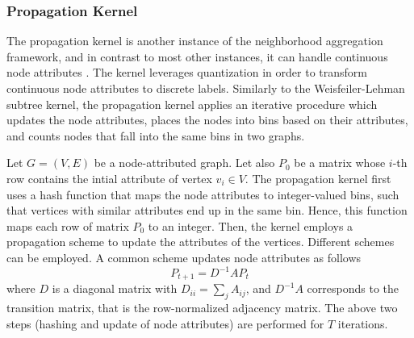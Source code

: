 \documentclass[twoside,11pt]{article}
\begin{document}
\subsubsection{Propagation Kernel}
The propagation kernel is another instance of the neighborhood aggregation framework, and in contrast to most other instances, it can handle continuous node attributes .
The kernel leverages quantization in order to transform continuous node attributes to discrete labels.
Similarly to the Weisfeiler-Lehman subtree kernel, the propagation kernel applies an iterative procedure which updates the node attributes, places the nodes into bins based on their attributes, and counts nodes that fall into the same bins in two graphs. 

Let $G=(V,E)$ be a node-attributed graph.
Let also $P_0$ be a matrix whose $i$-th row contains the intial attribute of vertex $v_i \in V$.
The propagation kernel first uses a hash function that maps the node attributes to integer-valued bins, such that vertices with similar attributes end up in the same bin.
Hence, this function maps each row of matrix $P_0$ to an integer.
Then, the kernel employs a propagation scheme to update the attributes of the vertices.
Different schemes can be employed.
A common scheme updates node attributes as follows
\begin{equation}
  P_{t+1} = D^{-1} A P_t
\end{equation}
where $D$ is a diagonal matrix with $D_{ii} = \sum_j A_{ij}$, and $D^{-1} A$ corresponds to the transition matrix, that is the row-normalized adjacency matrix.
The above two steps (hashing and update of node attributes) are performed for $T$ iterations.
\end{document}
